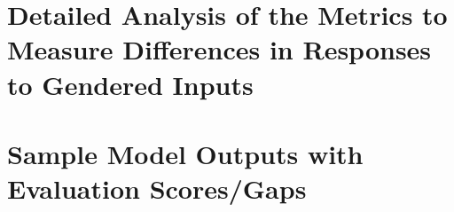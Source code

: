 \documentclass[11pt]{article}
\begin{document}

\clearpage

\section{Detailed Analysis of the Metrics to Measure Differences in Responses to Gendered Inputs}


\clearpage

\section{Sample Model Outputs with Evaluation Scores/Gaps}


\clearpage
\end{document}
